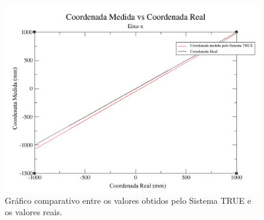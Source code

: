 	\begin{figure}[htb]
		\begin{center}
			\includegraphics[scale=0.4]{figuras/5.Testes/grafico-eixo-x.png}
		\end{center}
		\caption{Gráfico comparativo entre os valores obtidos pelo Sistema TRUE e os valores reais.}
		\label{fig:grafico-eixox}
	\end{figure}